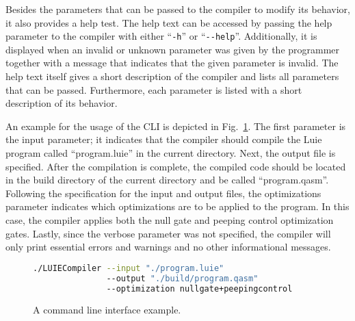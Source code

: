 Besides the parameters that can be passed to the compiler to modify its behavior, it also provides a help test. The help text can be accessed by passing the help parameter to the compiler with either ``\texttt{-h}'' or ``\texttt{-{}-help}''. Additionally, it is displayed when an invalid or unknown parameter was given by the programmer together with a message that indicates that the given parameter is invalid. The help text itself gives a short description of the compiler and lists all parameters that can be passed. Furthermore, each parameter is listed with a short description of its behavior.

An example for the usage of the CLI is depicted in Fig.~\ref{fig:concept_cli_example}. The first parameter is the input parameter; it indicates that the compiler should compile the Luie program called ``program.luie'' in the current directory. Next, the output file is specified. After the compilation is complete, the compiled code should be located in the build directory of the current directory and be called ``program.qasm''. Following the specification for the input and output files, the optimizations parameter indicates which optimizations are to be applied to the program. In this case, the compiler applies both the null gate and peeping control optimization gates. Lastly, since the verbose parameter was not specified, the compiler will only print essential errors and warnings and no other informational messages.
\begin{figure}[htp]
    \centering
    \begin{lstlisting}[language=bash, style=bashstyle]
./LUIECompiler --input "./program.luie" 
               --output "./build/program.qasm" 
               --optimization nullgate+peepingcontrol
    \end{lstlisting}
    \caption{A command line interface example.}
    \label{fig:concept_cli_example}
\end{figure}